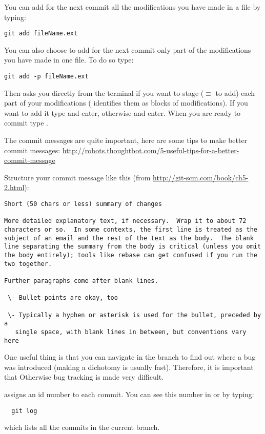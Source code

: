 You can add for the next commit all the modifications you have made in a file by typing:
\begin{lstlisting}
git add fileName.ext
\end{lstlisting}
You can also choose to add for the next commit only part of the modifications you have made in one file.
To do so type:
\begin{lstlisting}
git add -p fileName.ext
\end{lstlisting}
Then  asks you directly from the terminal if you want to stage ($\equiv$ to add) each part of your modifications ( identifies them as blocks of modifications).
If you want to add it type  and enter, otherwise  and enter.
When you are ready to commit type .

The commit messages are quite important, here are some tips to make better commit messages:
\url{http://robots.thoughtbot.com/5-useful-tips-for-a-better-commit-message}

Structure your commit message like this (from \url{http://git-scm.com/book/ch5-2.html}):
\begin{lstlisting}
Short (50 chars or less) summary of changes

More detailed explanatory text, if necessary.  Wrap it to about 72
characters or so.  In some contexts, the first line is treated as the
subject of an email and the rest of the text as the body.  The blank
line separating the summary from the body is critical (unless you omit
the body entirely); tools like rebase can get confused if you run the
two together.

Further paragraphs come after blank lines.

 \- Bullet points are okay, too

 \- Typically a hyphen or asterisk is used for the bullet, preceded by a
   single space, with blank lines in between, but conventions vary here
\end{lstlisting}

One useful thing is that you can navigate in the branch to find out where a bug was introduced (making a dichotomy is usually fast).
Therefore, it is important that 
Otherwise bug tracking is made very difficult.

 assigns an id number to each commit.
You can see this number in  or by typing:
\begin{lstlisting}
  git log
\end{lstlisting}
which lists all the commits in the current branch.

